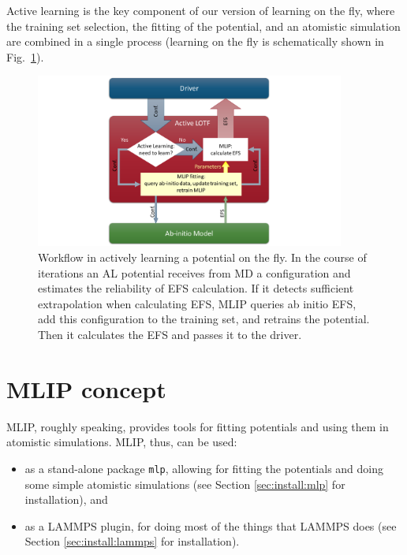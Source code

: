 \documentclass[12pt]{article}
\renewcommand{\_}{\char`_}
\begin{document}
Active learning is the key component of our version of learning on the fly, where the training set selection, the fitting of the potential, and an atomistic simulation are combined in a single process (learning on the fly is schematically shown in Fig.\ \ref{fig:LOTF}).

\begin{figure}[htbp]
	\centering
	\includegraphics[width=4.0in]{figs/LOTF.pdf}
	\caption{Workflow in actively learning a potential on the fly.
		In the course of iterations an AL potential receives from MD a configuration and estimates the reliability of EFS calculation.
		If it detects sufficient extrapolation when calculating EFS, MLIP queries ab initio EFS, add this configuration to the training set, and retrains the potential.
		Then it calculates the EFS and passes it to the driver.
	}
	\label{fig:LOTF}
\end{figure}

\section{MLIP concept} \label{sec:concept}

MLIP, roughly speaking, provides tools for fitting potentials and using them in atomistic simulations.
MLIP, thus, can be used:
\begin{itemize}
\item
as a stand-alone package \texttt{mlp}, allowing for fitting the potentials and doing some simple atomistic simulations (see Section \ref{sec:install:mlp} for installation), and

\item as a LAMMPS plugin, for doing most of the things that LAMMPS does (see Section \ref{sec:install:lammps} for installation).
\end{itemize}
\end{document}
